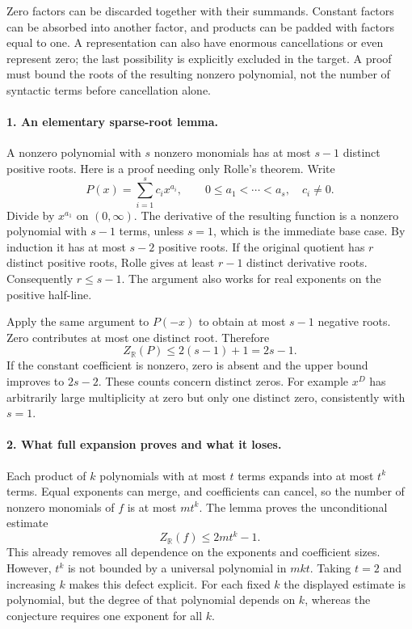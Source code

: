 \documentclass[11pt]{article}
\begin{document}
Zero factors can be discarded together with their summands. Constant factors can be absorbed into another factor, and products can be padded with factors equal to one. A representation can also have enormous cancellations or even represent zero; the last possibility is explicitly excluded in the target. A proof must bound the roots of the resulting nonzero polynomial, not the number of syntactic terms before cancellation alone.

\paragraph{1. An elementary sparse-root lemma.}
A nonzero polynomial with $s$ nonzero monomials has at most $s-1$ distinct positive roots. Here is a proof needing only Rolle's theorem. Write
\[
 P(x)=\sum_{i=1}^s c_i x^{a_i},\qquad
 0\le a_1<\cdots<a_s,\quad c_i\ne0.
\]
Divide by $x^{a_1}$ on $(0,\infty)$. The derivative of the resulting function is a nonzero polynomial with $s-1$ terms, unless $s=1$, which is the immediate base case. By induction it has at most $s-2$ positive roots. If the original quotient has $r$ distinct positive roots, Rolle gives at least $r-1$ distinct derivative roots. Consequently $r\le s-1$. The argument also works for real exponents on the positive half-line.

Apply the same argument to $P(-x)$ to obtain at most $s-1$ negative roots. Zero contributes at most one distinct root. Therefore
\[
 Z_{\mathbb R}(P)\le 2(s-1)+1=2s-1.
\]
If the constant coefficient is nonzero, zero is absent and the upper bound improves to $2s-2$. These counts concern distinct zeros. For example $x^D$ has arbitrarily large multiplicity at zero but only one distinct zero, consistently with $s=1$.

\paragraph{2. What full expansion proves and what it loses.}
Each product of $k$ polynomials with at most $t$ terms expands into at most $t^k$ terms. Equal exponents can merge, and coefficients can cancel, so the number of nonzero monomials of $f$ is at most $mt^k$. The lemma proves the unconditional estimate
\[
 Z_{\mathbb R}(f)\le 2mt^k-1.
\]
This already removes all dependence on the exponents and coefficient sizes. However, $t^k$ is not bounded by a universal polynomial in $mkt$. Taking $t=2$ and increasing $k$ makes this defect explicit. For each fixed $k$ the displayed estimate is polynomial, but the degree of that polynomial depends on $k$, whereas the conjecture requires one exponent for all $k$.
\end{document}
